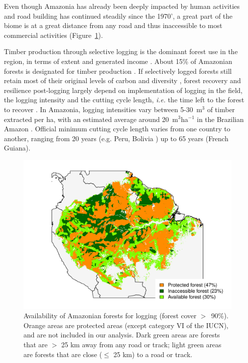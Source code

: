 \documentclass{article}
\begin{document}
Even though Amazonia has already been deeply impacted by human activities and road building has continued steadily since the 1970', a great part of the biome is at a great distance from any road and thus inaccessible to most commercial activities (Figure~\ref{fig:pharv}).

Timber production through selective logging is the dominant forest use in the region, in terms of extent and generated income \cite{Blaser2011}. About 15\% of Amazonian forests is designated for timber production \cite{FAO2011}. If selectively logged forests still retain most of their original levels of carbon and diversity \cite{Putz2012}, forest recovery and resilience post-logging largely depend on implementation of logging in the field, the logging intensity and the cutting cycle length, \textit{i.e.} the time left to the forest to recover \cite{Rutishauser2015,Piponiot2018}. In Amazonia, logging intensities vary between 5-30~m$^3$ of timber extracted per ha, with an estimated average around 20~m$^3$ha$^{-1}$ in the Brazilian Amazon \cite{Asner2005}. Official minimum cutting cycle length varies from one country to another, ranging from 20 years (e.g. Peru, Bolivia \cite{Fredericksen2003,Blaser2011}) up to 65 years (French Guiana). 

\begin{figure}
    \centering
    \includegraphics[width=\linewidth]{graphs/harv_areas.pdf}
    \caption{Availability of Amazonian forests for logging (forest cover $>$~90\%). Orange areas are protected areas (except category VI of the IUCN), and are not included in our analysis. Dark green areas are forests that are $>$ 25 km away from any road or track; light green areas are forests that are close ($\leq$ 25 km) to a road or track.}
    \label{fig:pharv}
\end{figure}
\end{document}
